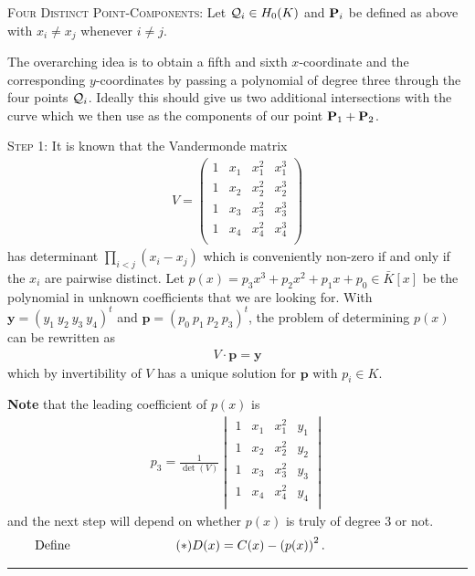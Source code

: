 \documentclass[english,11pt,a4paper]{article}
\begin{document}
\begin{case} {\scshape Four Distinct Point-Components:}
  Let $\q_i \in \enk$ and $\P_i$ be defined as above with $x_i \neq x_j$ whenever $i \neq j$.

  The overarching idea is to obtain a fifth and sixth $x$-coordinate and the corresponding $y$-coordinates by passing a polynomial of degree three through the four points $\q_i$. Ideally this should give us two additional intersections with the curve which we then use as the components of our point $\P_1 + \P_2$.

  {\scshape Step 1:} It is known that the Vandermonde matrix
  \begin{align*}V=
    \begin{pmatrix}
      1 & x_1 & x_1^2 & x_1^3\\
      1 & x_2 & x_2^2 & x_2^3\\
      1 & x_3 & x_3^2 & x_3^3\\
      1 & x_4 & x_4^2 & x_4^3\\
    \end{pmatrix}
  \end{align*}
  has determinant $\prod_{i < j} (x_i-x_j)$ which is conveniently non-zero if and only if the $x_i$ are pairwise distinct. Let $p(x) = p_3 x^3 + p_2 x^2 + p_1 x + p_0 \in \bar K[x]$ be the polynomial in unknown coefficients that we are looking for. With $\textbf{y} = (y_1 \ y_2 \ y_3 \ y_4)^t$ and $\textbf{p} = (p_0 \ p_1 \ p_2 \ p_3)^t$, the problem of determining $p(x)$ can be rewritten as
  \begin{align*}
    V \cdot \mathbf{p} = \mathbf{y}
  \end{align*}
  which by invertibility of $V$ has a unique solution for $\mathbf{p}$ with $p_i\in K$.

  \textbf{Note} that the leading coefficient of $p(x)$ is
  \begin{align*}
    p_3 = \frac{1}{\det (V)}
    \begin{vmatrix}
      1 & x_1 & x_1^2 & y_1\\
      1 & x_2 & x_2^2 & y_2\\
      1 & x_3 & x_3^2 & y_3\\
      1 & x_4 & x_4^2 & y_4\\   
    \end{vmatrix}
  \end{align*}
  and the next step will depend on whether $p(x)$ is truly of degree 3 or not.\vspace{-1mm}
\fline
\vspace{-2.5mm}
  \begin{align*}\tag{$\ast$} \label{sex}
    \rlap{\hspace{-44.5mm} Define}
    D(x) = C(x)-\left ( p(x) \right )^2.
  \end{align*}\vspace{-5mm}
  \hrule


\end{case}
\end{document}
